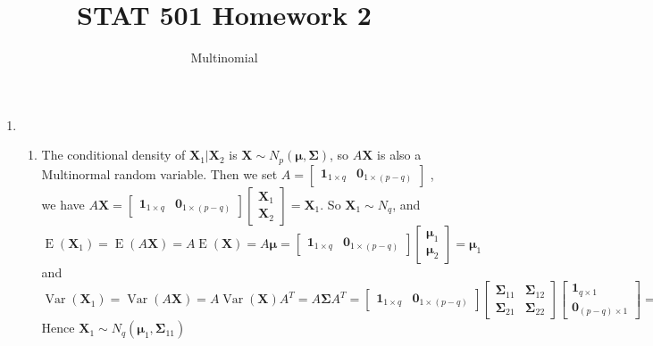 \documentclass{article}
\DeclareMathOperator{\Var}{Var}
\DeclareMathOperator{\E}{E}
\begin{document}
	

	
	\title{STAT 501 Homework 2}
	\author{Multinomial}
	\maketitle
	
	\begin{enumerate}[leftmargin = 0 em, label = \arabic*., font = \bfseries]
	\item 
	\begin{enumerate}
		\item The conditional density of $\bm X_1|\bm X_2$ is
		$\bm X \sim N_{p} (\bm \mu, \bm \Sigma)$, so $A \bm X$ is also a Multinormal random variable. Then we set $A = \begin{bmatrix}
			\bm 1_{1 \times q} & \bm 0_{1 \times (p - q)}
		\end{bmatrix}$ 
		, we have $A \bm X = \begin{bmatrix}
			\bm 1_{1\times q} & \bm 0_{1 \times (p-q)}
		\end{bmatrix} \begin{bmatrix}
			\bm X_1\\
			\bm X_2
		\end{bmatrix} = \bm X_1$. So $\bm X_1 \sim N_{q}$, and 
		\[\E(\bm X_1) = \E(A \bm X) = A \E(\bm X) = A \bm \mu = \begin{bmatrix}
			\bm 1_{1 \times q} & \bm 0_{1 \times (p-q)}
		\end{bmatrix} \begin{bmatrix}
			\bm \mu_1\\ \bm \mu_2
		\end{bmatrix} =  \bm \mu_{1}\]
		and
		\[\Var(\bm X_1) = \Var(A \bm X) = A \Var(\bm X) A^T = A \bm \Sigma A^T = \begin{bmatrix}
			\bm 1_{1 \times q} & \bm 0_{1\times (p-q)} 
		\end{bmatrix} \begin{bmatrix}
			\bm \Sigma_{11} & \bm \Sigma_{12}\\
			\bm \Sigma_{21} & \bm \Sigma_{22}
		\end{bmatrix} \begin{bmatrix}
			\bm 1_{q \times 1}\\
			\bm 0_{(p-q)\times 1}
		\end{bmatrix} = \bm \Sigma_{11}\]
		Hence $\bm X_1 \sim N_q (\bm \mu_1, \bm \Sigma_{11})$


\end{enumerate}
\end{enumerate}
\end{document}
